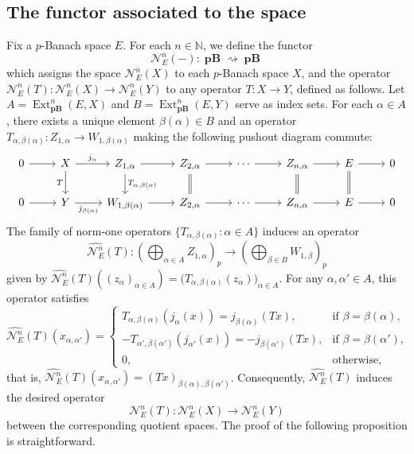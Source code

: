 \documentclass[12pt,a4paper]{amsproc}
\theoremstyle{remark}
\theoremstyle{definition}
\newcommand{\Ext}{\operatorname{Ext}}
\newcommand{\pBan}{\operatorname{\textbf{pB}}}
\numberwithin{equation}{section}
\begin{document}
	\subsection{The functor associated to the space}\label{sec:functor_n}
	Fix a $p$-Banach space $E$. For each $n \in \mathbb{N}$, we define the functor
\[
	\mathcal{N}_E^n(-): \boldsymbol{\pBan} \rightsquigarrow \boldsymbol{\pBan}
\]
which assigns the space $\mathcal{N}_E^n(X)$ to each $p$-Banach space $X$, and the operator $\mathcal{N}_E^n(T): \mathcal{N}_E^n(X) \to \mathcal{N}_E^n(Y)$ to any operator $T: X \to Y$, defined as follows. Let $A = \Ext^n_{\boldsymbol{\pBan}}(E,X)$ and $B = \Ext^n_{\boldsymbol{\pBan}}(E,Y)$ serve as index sets. For each $\alpha \in A$, there exists a unique element $\beta(\alpha) \in B$ and an operator $T_{\alpha, \beta(\alpha)}: Z_{1,\alpha} \to W_{1, \beta(\alpha)}$ making the following pushout diagram commute:
\begin{equation}\label{eq:PO-alfa}
	\begin{tikzcd}
		0 \arrow[r] & X \arrow[r, "j_\alpha"] \arrow[d, "T"'] & {Z_{1,\alpha}} \arrow[r] \arrow[d, "{T_{\alpha, \beta(\alpha)}}"] & {Z_{2,\alpha}} \arrow[r] \arrow[d, equal] & \cdots \arrow[r] & {Z_{n,\alpha}} \arrow[r] \arrow[d, equal] & E \arrow[r] \arrow[d, equal] & 0 \\
		0 \arrow[r] & Y \arrow[r, "j_{\beta(\alpha)}"'] & {W_{1,\beta(\alpha)}} \arrow[r] & {Z_{2,\alpha}} \arrow[r] & \cdots \arrow[r] & {Z_{n,\alpha}} \arrow[r] & E \arrow[r] & 0
	\end{tikzcd}
\end{equation}
The family of norm-one operators $\{T_{\alpha, \beta(\alpha)}: \alpha \in A\}$ induces an operator
\[
	\widehat{\mathcal{N}_E^n}(T): \left( \bigoplus_{\alpha \in A} Z_{1,\alpha} \right)_p \longrightarrow \left( \bigoplus_{\beta \in B} W_{1,\beta} \right)_p
\]
given by $\widehat{\mathcal{N}_E^n}(T)((z_\alpha)_{\alpha \in A}) = \big(T_{\alpha, \beta(\alpha)}(z_\alpha)\big)_{\alpha \in A}$. For any $\alpha, \alpha' \in A$, this operator satisfies
\[
	\widehat{\mathcal{N}_E^n}(T)(x_{\alpha,\alpha'}) = \begin{cases}
		T_{\alpha, \beta(\alpha)}(j_\alpha(x)) = j_{\beta(\alpha)}(Tx), & \text{if } \beta = \beta(\alpha), \\
		-T_{\alpha', \beta(\alpha')}(j_{\alpha'}(x)) = -j_{\beta(\alpha')}(Tx), & \text{if } \beta = \beta(\alpha'), \\
		0, & \text{otherwise,}
	\end{cases}
\]
that is, $\widehat{\mathcal{N}_E^n}(T)(x_{\alpha,\alpha'}) = (Tx)_{\beta(\alpha), \beta(\alpha')}$. Consequently, $\widehat{\mathcal{N}_E^n}(T)$ induces the desired operator
\[
	\mathcal{N}_E^n(T): \mathcal{N}_E^n(X) \longrightarrow \mathcal{N}_E^n(Y)
\]
between the corresponding quotient spaces. The proof of the following proposition is straightforward.
	
\end{document}
